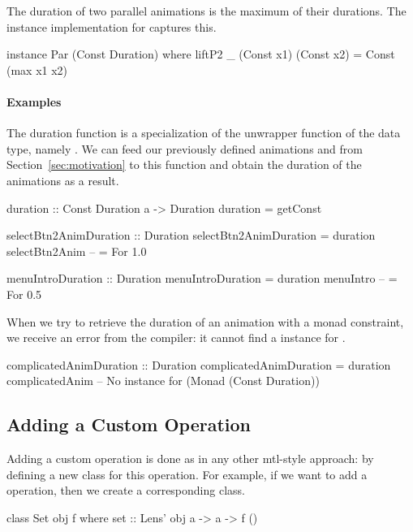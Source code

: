 The duration of two parallel animations is the maximum of their durations. 
The  instance implementation for  captures
this. 

\begin{code}
instance Par (Const Duration) where
  liftP2 _ (Const x1) (Const x2) = Const (max x1 x2)
\end{code}

\paragraph{Examples}

The duration function is a specialization of the unwrapper function of the
 data type, namely . We can feed our previously defined
animations  and  from
Section~\ref{sec:motivation} to this function and obtain the duration of the
animations as a result.

\begin{code}
duration :: Const Duration a -> Duration
duration = getConst

selectBtn2AnimDuration :: Duration
selectBtn2AnimDuration = duration selectBtn2Anim -- = For 1.0

menuIntroDuration :: Duration
menuIntroDuration = duration menuIntro -- = For 0.5
\end{code}

When we try to retrieve the duration of an animation with a monad constraint,
we receive an error from the compiler: it cannot find a  instance for
.

\begin{spec}
complicatedAnimDuration :: Duration
complicatedAnimDuration = duration complicatedAnim
-- No instance for (Monad (Const Duration))
\end{spec}

\subsection{Adding a Custom Operation}

Adding a custom operation is done as in any other mtl-style approach: by defining a new class for this operation. For example, if we want to add a  operation, then we create a corresponding  class.

\begin{code}
class Set obj f where set :: Lens' obj a -> a -> f ()
\end{code}

